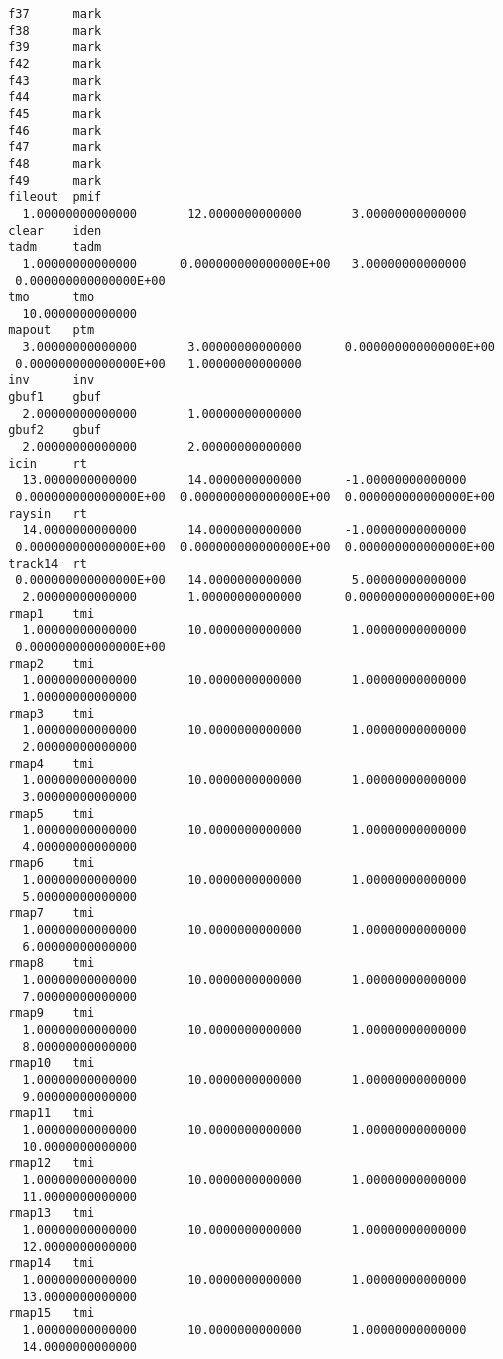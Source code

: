 \begin{footnotesize}
\begin{verbatim}
 f37      mark
 f38      mark
 f39      mark
 f42      mark
 f43      mark
 f44      mark
 f45      mark
 f46      mark
 f47      mark
 f48      mark
 f49      mark
 fileout  pmif
   1.00000000000000       12.0000000000000       3.00000000000000
 clear    iden
 tadm     tadm
   1.00000000000000      0.000000000000000E+00   3.00000000000000
  0.000000000000000E+00
 tmo      tmo
   10.0000000000000
 mapout   ptm
   3.00000000000000       3.00000000000000      0.000000000000000E+00
  0.000000000000000E+00   1.00000000000000
 inv      inv
 gbuf1    gbuf
   2.00000000000000       1.00000000000000
 gbuf2    gbuf
   2.00000000000000       2.00000000000000
 icin     rt
   13.0000000000000       14.0000000000000      -1.00000000000000
  0.000000000000000E+00  0.000000000000000E+00  0.000000000000000E+00
 raysin   rt
   14.0000000000000       14.0000000000000      -1.00000000000000
  0.000000000000000E+00  0.000000000000000E+00  0.000000000000000E+00
 track14  rt
  0.000000000000000E+00   14.0000000000000       5.00000000000000
   2.00000000000000       1.00000000000000      0.000000000000000E+00
 rmap1    tmi
   1.00000000000000       10.0000000000000       1.00000000000000
  0.000000000000000E+00
 rmap2    tmi
   1.00000000000000       10.0000000000000       1.00000000000000
   1.00000000000000
 rmap3    tmi
   1.00000000000000       10.0000000000000       1.00000000000000
   2.00000000000000
 rmap4    tmi
   1.00000000000000       10.0000000000000       1.00000000000000
   3.00000000000000
 rmap5    tmi
   1.00000000000000       10.0000000000000       1.00000000000000
   4.00000000000000
 rmap6    tmi
   1.00000000000000       10.0000000000000       1.00000000000000
   5.00000000000000
 rmap7    tmi
   1.00000000000000       10.0000000000000       1.00000000000000
   6.00000000000000
 rmap8    tmi
   1.00000000000000       10.0000000000000       1.00000000000000
   7.00000000000000
 rmap9    tmi
   1.00000000000000       10.0000000000000       1.00000000000000
   8.00000000000000
 rmap10   tmi
   1.00000000000000       10.0000000000000       1.00000000000000
   9.00000000000000
 rmap11   tmi
   1.00000000000000       10.0000000000000       1.00000000000000
   10.0000000000000
 rmap12   tmi
   1.00000000000000       10.0000000000000       1.00000000000000
   11.0000000000000
 rmap13   tmi
   1.00000000000000       10.0000000000000       1.00000000000000
   12.0000000000000
 rmap14   tmi
   1.00000000000000       10.0000000000000       1.00000000000000
   13.0000000000000
 rmap15   tmi
   1.00000000000000       10.0000000000000       1.00000000000000
   14.0000000000000

\end{verbatim}
\end{footnotesize}
